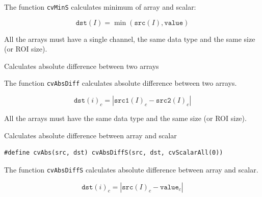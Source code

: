 \begin{description}
\end{description}

The function \texttt{cvMinS} calculates minimum of array and scalar:

\[
\texttt{dst}(I)=\min(\texttt{src}(I), \texttt{value})
\]

All the arrays must have a single channel, the same data type and the same size (or ROI size).

\label{AbsDiff}

Calculates absolute difference between two arrays


\begin{description}
\end{description}

The function \texttt{cvAbsDiff} calculates absolute difference between two arrays.

\[ \texttt{dst}(i)_c = |\texttt{src1}(I)_c - \texttt{src2}(I)_c| \]

All the arrays must have the same data type and the same size (or ROI size).

\label{AbsDiffS}

Calculates absolute difference between array and scalar


\begin{lstlisting}
#define cvAbs(src, dst) cvAbsDiffS(src, dst, cvScalarAll(0))
\end{lstlisting}

\begin{description}
\end{description}

The function \texttt{cvAbsDiffS} calculates absolute difference between array and scalar.

\[ \texttt{dst}(i)_c = |\texttt{src}(I)_c - \texttt{value}_c| \]

